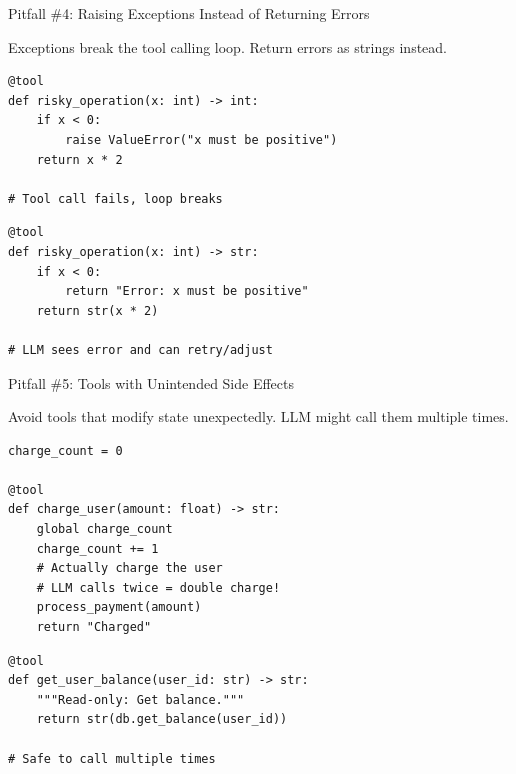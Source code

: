 \documentclass[aspectratio=169,11pt]{beamer}
\begin{document}
\begin{frame}[fragile,shrink=2]{Pitfall \#4: Raising Exceptions Instead of Returning Errors}
\begin{warningbox}
Exceptions break the tool calling loop. Return errors as strings instead.
\end{warningbox}

\begin{codebox}
\begin{lstlisting}
@tool
def risky_operation(x: int) -> int:
    if x < 0:
        raise ValueError("x must be positive")
    return x * 2

# Tool call fails, loop breaks
\end{lstlisting}
\end{codebox}

\begin{codebox}
\begin{lstlisting}
@tool
def risky_operation(x: int) -> str:
    if x < 0:
        return "Error: x must be positive"
    return str(x * 2)

# LLM sees error and can retry/adjust
\end{lstlisting}
\end{codebox}
\end{frame}

\begin{frame}[fragile,shrink=2]{Pitfall \#5: Tools with Unintended Side Effects}
\begin{warningbox}
Avoid tools that modify state unexpectedly. LLM might call them multiple times.
\end{warningbox}

\begin{codebox}
\begin{lstlisting}
charge_count = 0

@tool
def charge_user(amount: float) -> str:
    global charge_count
    charge_count += 1
    # Actually charge the user
    # LLM calls twice = double charge!
    process_payment(amount)
    return "Charged"
\end{lstlisting}
\end{codebox}

\begin{codebox}
\begin{lstlisting}
@tool
def get_user_balance(user_id: str) -> str:
    """Read-only: Get balance."""
    return str(db.get_balance(user_id))

# Safe to call multiple times
\end{lstlisting}
\end{codebox}
\end{frame}
\end{document}
